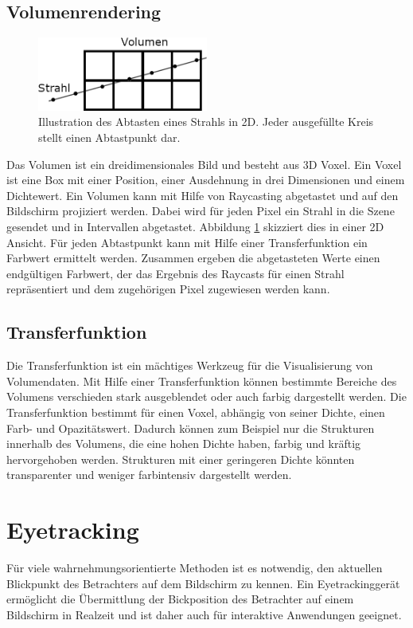 \subsection{Volumenrendering}
\begin{figure}
	\centering
	\includegraphics[width=0.5\textwidth]{../../Grafiken/Abtasten_eines_Strahls.png}
	\caption{Illustration des Abtasten eines Strahls in 2D. Jeder ausgefüllte Kreis stellt einen Abtastpunkt dar.}
	\label{fig::rc04}
\end{figure}
Das Volumen ist ein dreidimensionales Bild und besteht aus 3D Voxel.
Ein Voxel ist eine Box mit einer Position, einer Ausdehnung in drei Dimensionen und einem Dichtewert.
Ein Volumen kann mit Hilfe von Raycasting abgetastet und auf den Bildschirm projiziert werden.
Dabei wird für jeden Pixel ein Strahl in die Szene gesendet und in Intervallen abgetastet.
Abbildung \ref{fig::rc04} skizziert dies in einer 2D Ansicht.
Für jeden Abtastpunkt kann mit Hilfe einer Transferfunktion ein Farbwert ermittelt werden.
Zusammen ergeben die abgetasteten Werte einen endgültigen Farbwert, der das Ergebnis des Raycasts für einen Strahl repräsentiert und dem zugehörigen Pixel zugewiesen werden kann.

\subsection{Transferfunktion}
Die Transferfunktion ist ein mächtiges Werkzeug für die Visualisierung von Volumendaten.
Mit Hilfe einer Transferfunktion können bestimmte Bereiche des Volumens verschieden stark ausgeblendet oder auch farbig dargestellt werden.
Die Transferfunktion bestimmt für einen Voxel, abhängig von seiner Dichte, einen Farb- und Opazitätswert.
Dadurch können zum Beispiel nur die Strukturen innerhalb des Volumens, die eine hohen Dichte haben, farbig und kräftig hervorgehoben werden.
Strukturen mit einer geringeren Dichte könnten transparenter und weniger farbintensiv dargestellt werden.

\section{Eyetracking}\label{sec::eyetr}
Für viele wahrnehmungsorientierte Methoden ist es notwendig, den aktuellen Blickpunkt des Betrachters auf dem Bildschirm zu kennen.
Ein Eyetrackinggerät ermöglicht die Übermittlung der Bickposition des Betrachter auf einem Bildschirm in Realzeit und ist daher auch für interaktive Anwendungen geeignet.


